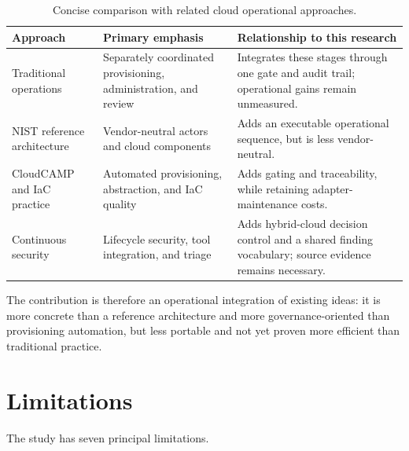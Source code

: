 \begin{table}[ht]
\centering
\small
\setlength{\tabcolsep}{4pt}
\caption{Concise comparison with related cloud operational approaches.}
\label{tab:discussion-comparison}
\begin{tabular}{|L{3.2cm}|L{4.4cm}|L{6.3cm}|}
\hline
\textbf{Approach} & \textbf{Primary emphasis} & \textbf{Relationship to this research} \\
\hline
Traditional operations & Separately coordinated provisioning, administration, and
review & Integrates these stages through one gate and audit trail; operational gains
remain unmeasured. \\
\hline
NIST reference architecture \cite{Liu2011NISTRA} & Vendor-neutral actors and cloud
components & Adds an executable operational sequence, but is less vendor-neutral. \\
\hline
CloudCAMP and IaC practice \cite{Bhattacharjee2019CloudCAMP,Guerriero2019IaC,Hasan2020IaCTesting}
& Automated provisioning, abstraction, and IaC quality & Adds gating and traceability,
while retaining adapter-maintenance costs. \\
\hline
Continuous security \cite{Kumar2020ADOC,Rajapakse2021ToolIntegration} & Lifecycle security,
tool integration, and triage & Adds hybrid-cloud decision control and a shared finding
vocabulary; source evidence remains necessary. \\
\hline
\end{tabular}
\end{table}

The contribution is therefore an operational integration of existing ideas: it is more
concrete than a reference architecture and more governance-oriented than provisioning
automation, but less portable and not yet proven more efficient than traditional practice.

\section{Limitations}
\label{sec:discussion-limitations}

The study has seven principal limitations.


